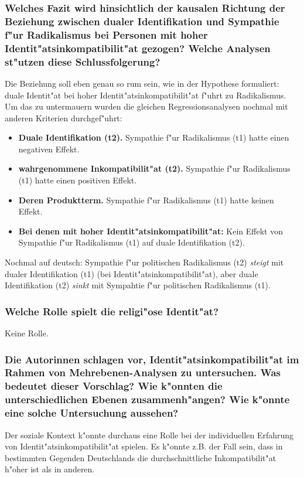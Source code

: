\subsubsection{Welches Fazit wird hinsichtlich der kausalen Richtung der Beziehung zwischen dualer Identifikation und Sympathie f"ur Radikalismus bei Personen mit hoher Identit"atsinkompatibilit"at gezogen? Welche Analysen st"utzen diese Schlussfolgerung?}
Die Beziehung soll eben genau so rum sein, wie in der Hypothese formuliert: duale Identit"at bei hoher Identit"atsinkompatibilit"at f"uhrt zu Radikalismus. Um das zu untermauern wurden die gleichen Regressionsanalysen nochmal mit anderen Kriterien durchgef"uhrt:
\begin{itemize}
        \item \textbf{Duale Identifikation (t2).} Sympathie f"ur Radikalismus (t1) hatte einen negativen Effekt.
        \item \textbf{wahrgenommene Inkompatibilit"at (t2).} Sympathie f"ur Radikalismus (t1) hatte einen positiven Effekt.
        \item \textbf{Deren Produktterm.} Sympathie f"ur Radikalismus (t1) hatte keinen Effekt.
        \item \textbf{Bei denen mit hoher Identit"atsinkompatibilit"at:} Kein Effekt von Sympathie f"ur Radikalismus (t1) auf duale Identifikation (t2).
\end{itemize}

\noindent Nochmal auf deutsch: Sympathie f"ur politischen Radikalismus (t2) \emph{steigt} mit dualer Identifikation (t1) (bei Identit"atsinkompatibilit"at), aber duale Identifikation (t2) \emph{sinkt} mit Sympahtie f"ur politischen Radikalismus (t1). 

\subsubsection{Welche Rolle spielt die religi"ose Identit"at?}
Keine Rolle.

\subsubsection{Die Autorinnen schlagen vor, Identit"atsinkompatibilit"at im Rahmen von Mehrebenen-Analysen zu untersuchen. Was bedeutet dieser Vorschlag? Wie k"onnten die unterschiedlichen Ebenen zusammenh"angen? Wie k"onnte eine solche Untersuchung aussehen?}

Der soziale Kontext k"onnte durchaus eine Rolle bei der individuellen Erfahrung von Identit"atsinkompatibilit"at spielen. Es k"onnte z.B. der Fall sein, dass in bestimmten Gegenden Deutschlands die durchschnittliche Inkompatibilit"at h"oher ist als in anderen. 
